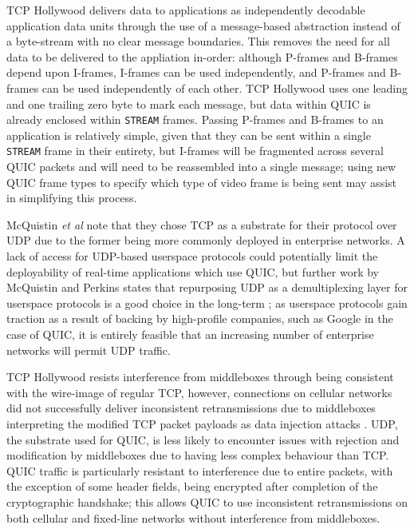 \documentclass{mprop}
\begin{document}
TCP Hollywood delivers data to applications as independently decodable application data units through the use of a message-based abstraction instead of a byte-stream with no clear message boundaries. This removes the need for all data to be delivered to the appliation in-order: although P-frames and B-frames depend upon I-frames, I-frames can be used independently, and P-frames and B-frames can be used independently of each other. TCP Hollywood uses one leading and one trailing zero byte to mark each message, but data within QUIC is already enclosed within \texttt{STREAM} frames. Passing P-frames and B-frames to an application is relatively simple, given that they can be sent within a single \texttt{STREAM} frame in their entirety, but I-frames will be fragmented across several QUIC packets and will need to be reassembled into a single message; using new QUIC frame types to specify which type of video frame is being sent may assist in simplifying this process.

McQuistin \textit{et al} note that they chose TCP as a substrate for their protocol over UDP due to the former being more commonly deployed in enterprise networks. A lack of access for UDP-based userspace protocols could potentially limit the deployability of real-time applications which use QUIC, but further work by McQuistin and Perkins states that repurposing UDP as a demultiplexing layer for userspace protocols is a good choice in the long-term \cite{McQuistin2016Ossification}; as userspace protocols gain traction as a result of backing by high-profile companies, such as Google in the case of QUIC, it is entirely feasible that an increasing number of enterprise networks will permit UDP traffic.

TCP Hollywood resists interference from middleboxes through being consistent with the wire-image of regular TCP, however, connections on cellular networks did not successfully deliver inconsistent retransmissions due to middleboxes interpreting the modified TCP packet payloads as data injection attacks \cite{McQuistin2016Ossification}. UDP, the substrate used for QUIC, is less likely to encounter issues with rejection and modification by middleboxes due to having less complex behaviour than TCP. QUIC traffic is particularly resistant to interference due to entire packets, with the exception of some header fields, being encrypted after completion of the cryptographic handshake; this allows QUIC to use inconsistent retransmissions on both cellular and fixed-line networks without interference from middleboxes.
\end{document}
